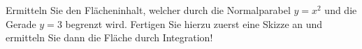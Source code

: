\item Ermitteln Sie den Flächeninhalt, welcher durch die Normalparabel $y=x^2$ und die Gerade $y=3$ begrenzt wird. Fertigen Sie hierzu zuerst eine Skizze an und ermitteln Sie dann die Fläche durch Integration!
